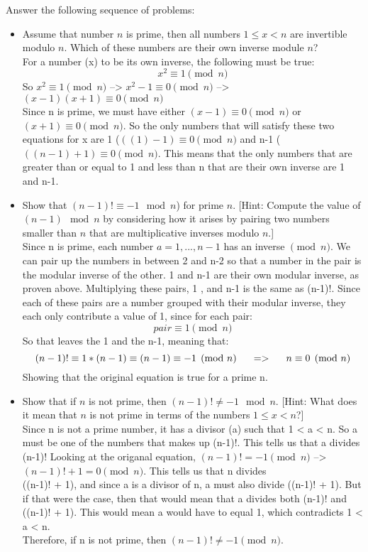 \documentclass{article}
\begin{document}
\newpage

 Answer the following sequence of problems:
\begin{itemize}

\item Assume that number $n$ is prime, then all numbers $1 \leq x < n$
  are invertible modulo $n$. Which of these numbers are their own
  inverse module $n$?\\

For a number (x) to be its own inverse, the following must be true:
$$x^{2} \equiv 1 \pmod{n}$$
So $x^{2} \equiv 1 \pmod{n}$ --> $x^{2}-1 \equiv 0 \pmod{n}$
--> $(x-1)(x+1) \equiv 0 \pmod{n}$\\
Since n is prime, we must have either $(x-1) \equiv 0 \pmod{n}$
or $(x+1) \equiv 0 \pmod{n}$. So the only numbers that will satisfy 
these two equations for x are 1 ($((1)-1) \equiv 0 \pmod{n}$ and 
n-1 ($((n-1)+1) \equiv 0 \pmod{n}$. This means that the only numbers
that are greater than or equal to 1 and less than n that are their own
inverse are 1 and n-1.

\item Show that $(n-1)! \equiv -1 \mod n$) for prime $n$. [Hint:
  Compute the value of $(n-1) \mod n$ by considering how it arises by
  pairing two numbers smaller than $n$ that are multiplicative
  inverses modulo $n$.]\\

Since n is prime, each number $a = {1, ... , n-1}$ has an inverse $\pmod{n}$. 
We can pair up the numbers in between 2 and n-2 so that a number in the pair
is the modular inverse of the other. 1 and n-1 are their own modular inverse, as proven above.
Multiplying these pairs, 1 , and n-1 is the same as (n-1)!. Since each of these pairs
are a number grouped with their modular inverse, they each only contribute a value of 1,
since for each pair:
$$pair \equiv 1 \pmod{n}$$
So that leaves the 1 and the n-1, meaning that:
$$(n-1)! \equiv 1 * (n-1) \equiv (n-1) \equiv -1 \pmod{n} \hspace{.2in}=> \hspace{.2in} n \equiv 0 \pmod{n}$$
Showing that the original equation is true for a prime n.


\item Show that if $n$ is not prime, then $(n-1)! \neq -1 \mod
  n$. [Hint: What does it mean that $n$ is not prime in terms of the
    numbers $1 \leq x < n$?]\\

Since n is not a prime number, it has a divisor (a) such that 1 < a < n.
So a must be one of the numbers that makes up (n-1)!. This tells us that
a divides (n-1)! Looking at the origanal equation, $(n-1)! = -1 \pmod{n}$
--> $(n-1)!+1 = 0 \pmod{n}$. This tells us that n divides\\((n-1)! + 1), and since
a is a divisor of n, a must also divide ((n-1)! + 1). But if that were the case, then
that would mean that a divides both (n-1)! and ((n-1)! + 1). This would mean a would 
have to equal 1, which contradicts 1 < a < n.\\Therefore, if n is not prime, then
$(n-1)! \neq -1 \pmod{n}$.


\end{itemize}
\end{document}
